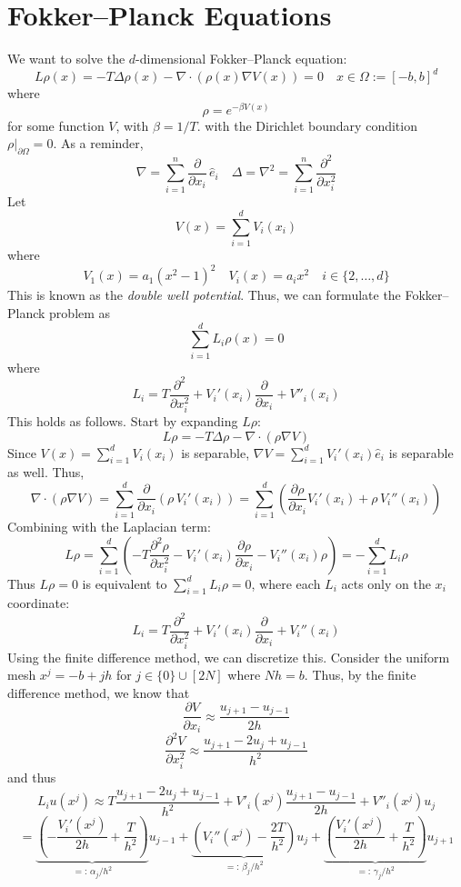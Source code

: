 \documentclass[12pt]{article}
\theoremstyle{definition}
\theoremstyle{remark}
\begin{document}
\section{Fokker--Planck Equations}\label{sec:fokker-planck}
We want to solve the $d$-dimensional Fokker--Planck equation:
\[
L \rho(x) = -T \Delta \rho(x) - \nabla \cdot (\rho(x) \nabla V(x))  = 0 \quad x \in \Omega := [-b, b]^d
\]
where 
\[
\rho = e^{-\beta V(x)}
\]
for some function $V$, with $\beta = 1/T$.
with the Dirichlet boundary condition $\rho|_{\partial \Omega} = 0$. As a reminder,
\[
\nabla = \sum_{i=1}^{n} \frac{\partial}{\partial x_i}\,\hat{e}_i \quad \Delta = \nabla^2 = \sum_{i=1}^{n} \frac{\partial^2}{\partial x_i^2}
\]
Let 
\[
V(x) = \sum_{i = 1}^d V_i (x_i)
\]
where 
\[
V_1(x) = a_1(x^2-1)^2 \quad V_i(x) = a_i x^2 \quad i \in \{2, \dots, d\}
\]
This is known as the \emph{double well potential}. Thus, we can formulate the Fokker--Planck problem as
\[
\sum_{i=1}^d L_i \rho(x) = 0 
\]
where 
\[
L_i = T \frac{\partial^2}{\partial x_i^2} + V_i'(x_i) \frac{\partial}{\partial x_i} + V''_i(x_i)
\]
This holds as follows. Start by expanding $L\rho$:
\[
L\rho = -T\Delta\rho - \nabla \cdot (\rho \nabla V)
\]
Since $V(x) = \sum_{i=1}^d V_i(x_i)$ is separable, 
$\nabla V = \sum_{i=1}^d V_i'(x_i)\hat{e}_i$ is separable as well. Thus, 
\[
\nabla \cdot (\rho \nabla V) 
= \sum_{i=1}^d \frac{\partial}{\partial x_i}\left(\rho \, V_i'(x_i)\right) 
= \sum_{i=1}^d \left(\frac{\partial \rho}{\partial x_i} V_i'(x_i) + \rho \, V_i''(x_i)\right)
\]
Combining with the Laplacian term:
\[
L\rho 
= \sum_{i=1}^d \left( -T\frac{\partial^2 \rho}{\partial x_i^2} 
- V_i'(x_i)\frac{\partial \rho}{\partial x_i} 
- V_i''(x_i)\rho \right) 
= -\sum_{i=1}^d L_i \rho
\]
%
Thus $L\rho = 0$ is equivalent to $\sum_{i=1}^d L_i \rho = 0$, 
where each $L_i$ acts only on the $x_i$ coordinate:
%
\[
L_i = T\frac{\partial^2}{\partial x_i^2}
+ V_i'(x_i)\frac{\partial}{\partial x_i}
+ V_i''(x_i)
\]
Using the finite difference method, we can discretize this. Consider the uniform mesh $x^j = -b + jh$ for $j \in \{0\} \cup [2N]$ where $Nh = b$. Thus, by the finite difference method, we know that 
\[
\frac{\partial V}{\partial x_i} \approx \frac{u_{j+1} - u_{j-1}}{2h}
\]
\[
\frac{\partial^2V}{\partial x_i^2} \approx \frac{u_{j+1} - 2u_j + u_{j-1}}{h^2}
\]
and thus 
\[
L_i u(x^j) \approx T \frac{u_{j+1} - 2u_j + u_{j-1}}{h^2} + V'_i(x^j) \frac{u_{j+1} - u_{j-1}}{2h} + V''_i (x^j)u_j
\]
\[
= \underbrace{\left(-\frac{V_i'(x^j)}{2h} + \frac{T}{h^2}\right)}_{=:\,\alpha_j/h^2} u_{j-1}
+ \underbrace{\left(V_i''(x^j) - \frac{2T}{h^2}\right)}_{=:\,\beta_j/h^2} u_j
+ \underbrace{\left(\frac{V_i'(x^j)}{2h} + \frac{T}{h^2}\right)}_{=:\,\gamma_j/h^2} u_{j+1}
\]
\end{document}
